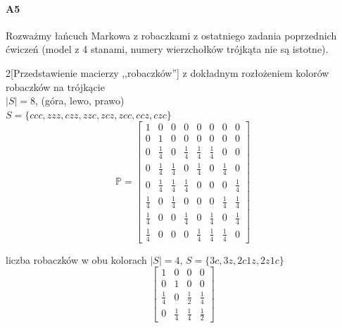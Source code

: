 \paragraph{A5} Rozważmy łańcuch Markowa z robaczkami z ostatniego zadania poprzednich ćwiczeń (model z 4 stanami, numery wierzchołków trójkąta nie są istotne).
\begin{multicols}{2}[Przedstawienie macierzy ,,robaczków'']
z  dokładnym rozłożeniem kolorów robaczków na trójkącie\\
$|S|=8$, (góra, lewo, prawo)\\ $S=\{ccc,zzz,czz,zzc,zcz,zcc,ccz,czc\}$
$$\mathbb{P}=\begin{bmatrix}
1&0&0&0&0&0&0&0\\
0&1&0&0&0&0&0&0\\
0&\frac{1}{4}&0&\frac{1}{4}&\frac{1}{4}&\frac{1}{4}&0&0\\
0&\frac{1}{4}&\frac{1}{4}&0&\frac{1}{4}&0&\frac{1}{4}&0\\
0&\frac{1}{4}&\frac{1}{4}&\frac{1}{4}&0&0&0&\frac{1}{4}\\
\frac{1}{4}&0&\frac{1}{4}&0&0&0&\frac{1}{4}&\frac{1}{4}\\
\frac{1}{4}&0&0&\frac{1}{4}&0&\frac{1}{4}&0&\frac{1}{4}\\
\frac{1}{4}&0&0&0&\frac{1}{4}&\frac{1}{4}&\frac{1}{4}&0
\end{bmatrix}$$

liczba robaczków w obu kolorach
$|S|=4$, $S=\{3c,3z,2c1z,2z1c\}$
$$\begin{bmatrix}
1&0&0&0\\
0&1&0&0\\
\frac{1}{4}&0&\frac{1}{2}&\frac{1}{4}\\
0&\frac{1}{4}&\frac{1}{4}&\frac{1}{2}
\end{bmatrix}$$
\end{multicols}
